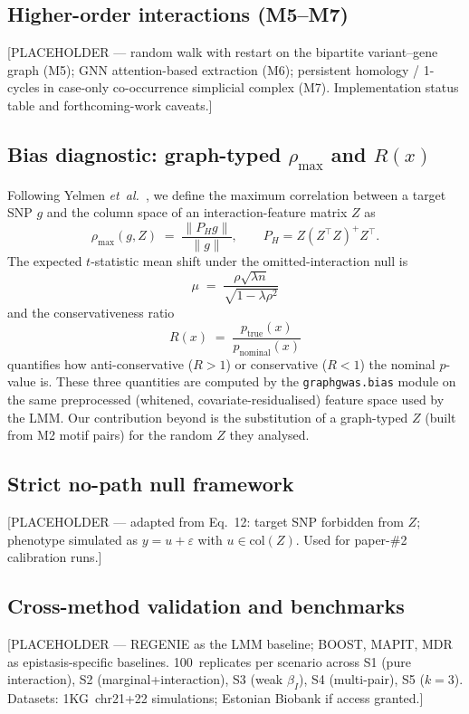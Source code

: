 \subsection{Higher-order interactions (M5--M7)}\label{sec:methods_m5_m7}

[PLACEHOLDER --- random walk with restart on the bipartite
variant--gene graph (M5); GNN attention-based extraction (M6);
persistent homology / 1-cycles in case-only co-occurrence
simplicial complex (M7). Implementation status table and
forthcoming-work caveats.]

\subsection{Bias diagnostic: graph-typed $\rho_{\max}$ and $R(x)$}\label{sec:methods_bias}

Following Yelmen \emph{et~al.}\ \cite{yelmen2026}, we define the
maximum correlation between a target SNP $g$ and the column space
of an interaction-feature matrix $Z$ as
\begin{equation}
\rho_{\max}(g, Z) \;=\; \frac{\lVert P_{H} g \rVert}{\lVert g \rVert},
\qquad P_{H} = Z(Z^{\top}Z)^{+}Z^{\top}.
\end{equation}
The expected $t$-statistic mean shift under the omitted-interaction
null is
\begin{equation}
\mu \;=\; \frac{\rho\sqrt{\lambda n}}{\sqrt{1-\lambda\rho^{2}}}
\end{equation}
and the conservativeness ratio
\begin{equation}
R(x) \;=\; \frac{p_{\text{true}}(x)}{p_{\text{nominal}}(x)}
\end{equation}
quantifies how anti-conservative ($R{>}1$) or conservative ($R{<}1$)
the nominal $p$-value is. These three quantities are computed by the
\texttt{graphgwas.bias} module on the same preprocessed (whitened,
covariate-residualised) feature space used by the LMM. Our
contribution beyond \cite{yelmen2026} is the substitution of a
graph-typed $Z$ (built from M2 motif pairs) for the random $Z$ they
analysed.

\subsection{Strict no-path null framework}\label{sec:methods_null}

[PLACEHOLDER --- adapted from \cite{yelmen2026} Eq.~12: target SNP
forbidden from $Z$; phenotype simulated as $y = u + \varepsilon$ with
$u \in \mathrm{col}(Z)$. Used for paper-\#2 calibration runs.]

\subsection{Cross-method validation and benchmarks}\label{sec:methods_benchmarks}

[PLACEHOLDER --- REGENIE \cite{mbatchou2021} as the LMM baseline;
BOOST, MAPIT, MDR as epistasis-specific baselines. 100~replicates
per scenario across S1 (pure interaction), S2 (marginal+interaction),
S3 (weak $\beta_{I}$), S4 (multi-pair), S5 ($k=3$). Datasets:
1KG~chr21+22 simulations; Estonian Biobank if access granted.]
